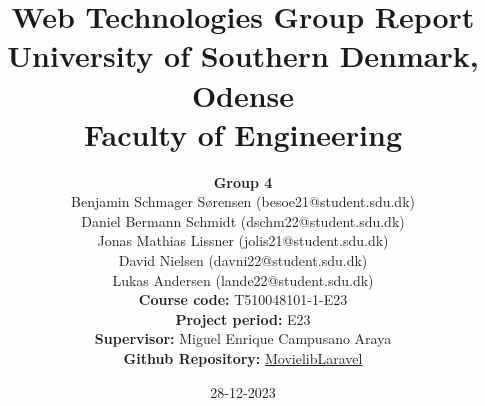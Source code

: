 


\title{\vspace*{-2cm}\textbf{
             Web Technologies Group Report}\vspace*{0.5em} \\
      University of Southern Denmark, Odense \vspace*{0.5em}\\
     Faculty of Engineering}
\date{{28-12-2023}\vspace*{3em}}


\maketitle

\begin{center}
    \author{\large \textbf{Group 4}\\\vspace*{3mm}
        \vspace*{3mm}
        \large Benjamin Schmager Sørensen (besoe21@student.sdu.dk)\\
        \vspace*{3mm}
        \large Daniel Bermann Schmidt (dschm22@student.sdu.dk)\\
        \vspace*{3mm}
        \large Jonas Mathias Lissner (jolis21@student.sdu.dk)\\
        \vspace*{3mm}
        \large David Nielsen (davni22@student.sdu.dk)\\
        \vspace*{3mm}
        \large  Lukas Andersen (lande22@student.sdu.dk)\\
        \vspace*{3mm}\vspace*{3mm}\vspace*{3mm}
        \large \textbf{Course code:} T510048101-1-E23\vspace*{1em}\\
        \large \textbf{Project period:} E23\vspace*{1em}\\
        \large \textbf{Supervisor:} Miguel Enrique Campusano Araya\vspace*{1em}\\
        \large \textbf{Github Repository:} \href{https://github.com/Kururururururururu/MovielibLaravel.git}{MovielibLaravel}\vspace*{1em}\\
    }
\end{center}

\maketitle


\thispagestyle{empty}
\clearpage
{}